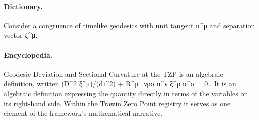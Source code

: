 \paragraph{Dictionary.}
Consider a congruence of timelike geodesics with unit tangent u\textasciicircum{}μ and separation vector ξ\textasciicircum{}μ.

\paragraph{Encyclopedia.}
Geodesic Deviation and Sectional Curvature at the TZP is an algebraic definition, written (D\textasciicircum{}2 ξ\textasciicircum{}μ)/(dτ\textasciicircum{}2) + R\textasciicircum{}μ\_νρσ u\textasciicircum{}ν ξ\textasciicircum{}ρ u\textasciicircum{}σ = 0.. It is an algebraic definition expressing the quantity directly in terms of the variables on its right-hand side. Within the Trawin Zero Point registry it serves as one element of the framework's mathematical narrative.
